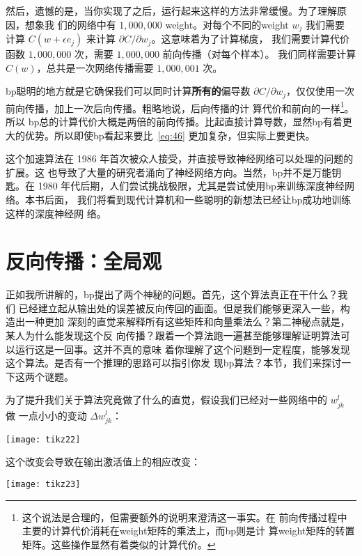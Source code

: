 然后，遗憾的是，当你实现了之后，运行起来这样的方法非常缓慢。为了理解原因，想象我
们的网络中有 $1,000,000$ \gls*{weight}。对每个不同的\gls*{weight} $w_j$ 我们需要
计算 $C(w+\epsilon e_j)$ 来计算 $\partial C/\partial w_j$。这意味着为了计算梯度，
我们需要计算代价函数 $1, 000, 000 $ 次，需要 $1, 000, 000$ 前向传播（对每个样本）。
我们同样需要计算 $C(w)$，总共是一次网络传播需要 $1,000,001$ 次。

\gls*{bp}聪明的地方就是它确保我们可以同时计算\textbf{所有的}偏导数 $\partial
C/\partial w_j$，仅仅使用一次前向传播，加上一次后向传播。粗略地说，后向传播的计
算代价和前向的一样\footnote{这个说法是合理的，但需要额外的说明来澄清这一事实。在
  前向传播过程中主要的计算代价消耗在\gls*{weight}矩阵的乘法上，而\gls*{bp}则是计
  算\gls*{weight}矩阵的转置矩阵。这些操作显然有着类似的计算代价。}。所以%
\gls*{bp}总的计算代价大概是两倍的前向传播。比起直接计算导数，显然\gls*{bp}有着更
大的优势。所以即使\gls*{bp}看起来要比~\eqref{eq:46} 更加复杂，但实际上要更快。

这个加速算法在 1986 年首次被众人接受，并直接导致神经网络可以处理的问题的扩展。这
也导致了大量的研究者涌向了神经网络方向。当然，\gls*{bp}并不是万能钥匙。在 1980
年代后期，人们尝试挑战极限，尤其是尝试使用\gls*{bp}来训练深度神经网络。本书后面，
我们将看到现代计算机和一些聪明的新想法已经让\gls*{bp}成功地训练这样的深度神经网
络。

\section{反向传播：全局观}
\label{sec:backpropagation_the_big_picture}

正如我所讲解的，\gls*{bp}提出了两个神秘的问题。首先，这个算法真正在干什么？我们
已经建立起从输出处的误差被反向传回的画面。但是我们能够更深入一些，构造出一种更加
深刻的直觉来解释所有这些矩阵和向量乘法么？第二神秘点就是，某人为什么能发现这个反
向传播？跟着一个算法跑一遍甚至能够理解证明算法可以运行这是一回事。这并不真的意味
着你理解了这个问题到一定程度，能够发现这个算法。是否有一个推理的思路可以指引你发
现\gls*{bp}算法？本节，我们来探讨一下这两个谜题。

为了提升我们关于算法究竟做了什么的直觉，假设我们已经对一些网络中的 $w_{jk}^l$ 做
一点小小的变动 $\Delta w_{jk}^l$：

\begin{center}
  \texttt{[image: tikz22]}
\end{center}

这个改变会导致在输出激活值上的相应改变：

\begin{center}
  \texttt{[image: tikz23]}
\end{center}

